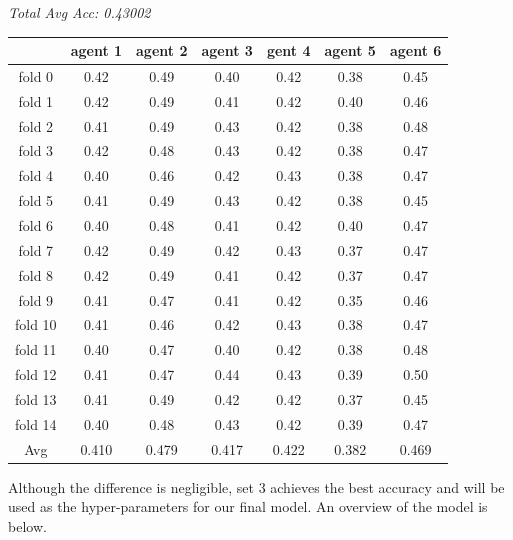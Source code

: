 \documentclass[10pt]{article}
\begin{document}
\begin{center}
    \textit{Total Avg Acc: 0.43002}
    \footnotesize
    \begin{tabular}{| c | c | c | c | c | c | c |}
      \hline
       & agent 1 & agent 2 & agent 3 & gent 4 & agent 5 & agent 6 \\
      \hline
      fold 0 & 0.42 & 0.49 & 0.40 & 0.42 & 0.38 & 0.45 \\
      fold 1 & 0.42 & 0.49 & 0.41 & 0.42 & 0.40 & 0.46 \\
      fold 2 & 0.41 & 0.49 & 0.43 & 0.42 & 0.38 & 0.48 \\
      fold 3 & 0.42 & 0.48 & 0.43 & 0.42 & 0.38 & 0.47 \\
      fold 4 & 0.40 & 0.46 & 0.42 & 0.43 & 0.38 & 0.47 \\
      fold 5 & 0.41 & 0.49 & 0.43 & 0.42 & 0.38 & 0.45 \\
      fold 6 & 0.40 & 0.48 & 0.41 & 0.42 & 0.40 & 0.47 \\
      fold 7 & 0.42 & 0.49 & 0.42 & 0.43 & 0.37 & 0.47 \\
      fold 8 & 0.42 & 0.49 & 0.41 & 0.42 & 0.37 & 0.47 \\
      fold 9 & 0.41 & 0.47 & 0.41 & 0.42 & 0.35 & 0.46 \\
      fold 10 & 0.41 & 0.46 & 0.42 & 0.43 & 0.38 & 0.47 \\
      fold 11 & 0.40 & 0.47 & 0.40 & 0.42 & 0.38 & 0.48 \\
      fold 12 & 0.41 & 0.47 & 0.44 & 0.43 & 0.39 & 0.50 \\
      fold 13 & 0.41 & 0.49 & 0.42 & 0.42 & 0.37 & 0.45 \\
      fold 14 & 0.40 & 0.48 & 0.43 & 0.42 & 0.39 & 0.47 \\
      Avg & 0.410 & 0.479 & 0.417 & 0.422 & 0.382 & 0.469 \\
      \hline
    \end{tabular}
    \normalsize
  \end{center}

  \quad Although the difference is negligible, set 3 achieves the best accuracy and will be used as the hyper-parameters for our final model. An overview of the model is below.
\end{document}
